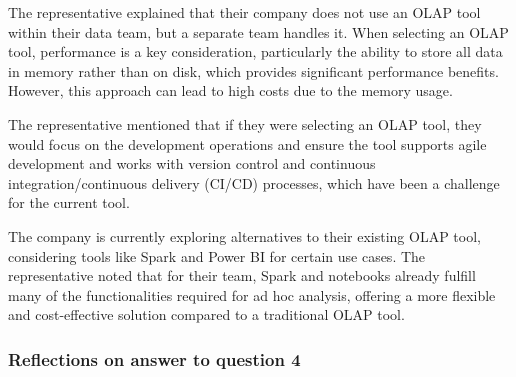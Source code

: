 The representative explained that their company does not use an OLAP tool within their data team, but a separate team handles it. When 
selecting an OLAP tool, performance is a key consideration, particularly the ability to store all data in memory rather than on disk, which 
provides significant performance benefits. However, this approach can lead to high costs due to the memory usage.

The representative mentioned that if they were selecting an OLAP tool, they would focus on the development operations and ensure the tool 
supports agile development and works with version control and continuous integration/continuous delivery (CI/CD) processes, which have been 
a challenge for the current tool.

The company is currently exploring alternatives to their existing OLAP tool, considering tools like Spark and Power BI for certain use cases. 
The representative noted that for their team, Spark and notebooks already fulfill many of the functionalities required for ad hoc analysis, 
offering a more flexible and cost-effective solution compared to a traditional OLAP tool.

\subsubsection{Reflections on answer to question 4}






